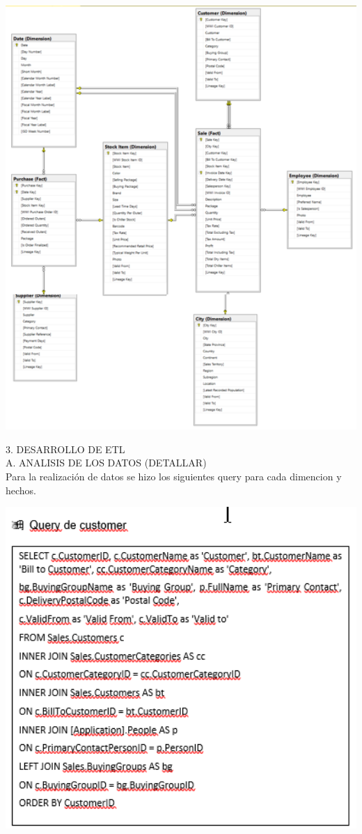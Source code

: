 \documentclass[12pt,letterpaper]{article}
\begin{document}
\begin{center}
\includegraphics[width=17cm]{IMG/15.png} 
\end{center}

3.	DESARROLLO DE ETL\\

A.	ANALISIS DE LOS DATOS (DETALLAR)\\
Para la realizaci\'on de datos se hizo los siguientes query para cada dimencion y hechos.\\

\begin{center}
\includegraphics[width=17cm]{IMG/16.png} 
\end{center}
\end{document}
